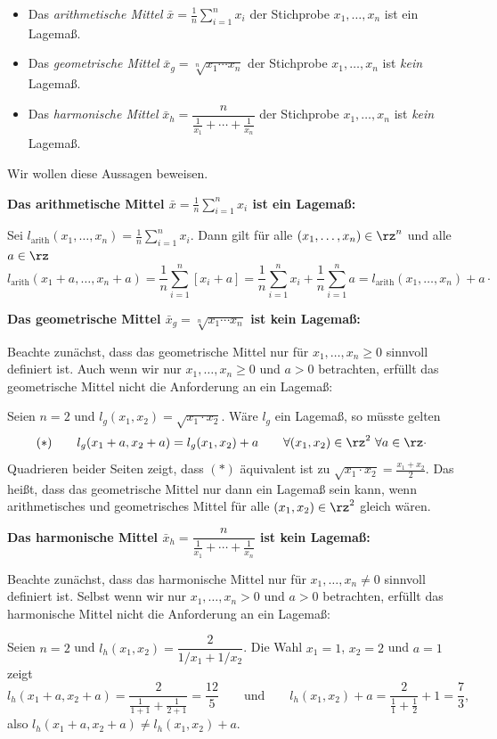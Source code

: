 \begin{bsp}
    \begin{itemize}
        \item Das \emph{arithmetische Mittel} $\bar x = \frac{1}{n}\sum_{i=1}^n x_i$ der Stichprobe $x_1,\dots,x_n$ ist ein \gls{Lagemaß}.
        \item Das \emph{geometrische Mittel} $\bar x_g = \sqrt[n]{x_1\cdots x_n}$ der Stichprobe $x_1,\dots,x_n$ ist \emph{kein} \gls{Lagemaß}.
        \item Das \emph{harmonische Mittel} $\bar x_h = \dfrac{n}{\frac{1}{x_1}+\cdots+\frac{1}{x_n}}$ der Stichprobe $x_1,\dots,x_n$ ist \emph{kein} \gls{Lagemaß}.
    \end{itemize}

    Wir wollen diese Aussagen beweisen.

    \smallskip
    \noindent\textbf{Das arithmetische Mittel $\bar x=\frac{1}{n}\sum_{i=1}^n x_i$ ist ein Lagemaß:}

    Sei $l_{\mathrm{arith}}(x_1,\dots,x_n) = \frac1n\sum_{i=1}^n x_i$.
    Dann gilt für alle $(x_1,\dots,x_n)\in\rz^n$ und alle $a\in\rz$
    \[
        l_{\mathrm{arith}}(x_1+a,\dots,x_n+a) = \frac1n \sum_{i=1}^n [x_i+a] = \frac1n\sum_{i=1}^n x_i + \frac1n\sum_{i=1}^n a = l_{\mathrm{arith}}(x_1,\dots,x_n) + a \cdot
    \]

    \smallskip
    \noindent\textbf{Das geometrische Mittel $\bar x_g = \sqrt[n]{x_1\cdots x_n}$ ist kein Lagemaß:}

    Beachte zunächst, dass das geometrische Mittel nur für $x_1,\dots,x_n\geq 0$ sinnvoll definiert ist.
    Auch wenn wir nur $x_1,\dots,x_n\geq 0$ und $a>0$ betrachten, erfüllt das geometrische Mittel nicht die Anforderung an ein \gls{Lagemaß}:

Seien $n=2$ und $l_g(x_1,x_2)=\sqrt{x_1\cdot x_2}$.
    Wäre $l_g$ ein \gls{Lagemaß}, so müsste gelten
    \[
        (*) \qquad l_g(x_1+a,x_2+a) = l_g(x_1,x_2)+a \qquad \forall (x_1,x_2)\in\rz^2 \ \forall a\in\rz \cdot
    \]
    Quadrieren beider Seiten zeigt, dass $(*)$ äquivalent ist zu $\sqrt{x_1\cdot x_2} = \frac{x_1+x_2}{2}$.
Das heißt, dass das geometrische Mittel nur dann ein \gls{Lagemaß} sein kann, wenn arithmetisches und geometrisches Mittel für alle $(x_1,x_2)\in\rz^2$ gleich wären.

    \smallskip
    \noindent\textbf{Das harmonische Mittel $\bar x_h = \dfrac{n}{\frac1{x_1}+\cdots+\frac1{x_n}}$ ist kein Lagemaß:}

    Beachte zunächst, dass das harmonische Mittel nur für $x_1,\dots,x_n\neq 0$ sinnvoll definiert ist.
    Selbst wenn wir nur $x_1,\dots,x_n>0$ und $a>0$ betrachten, erfüllt das harmonische Mittel nicht die Anforderung an ein \gls{Lagemaß}:

Seien $n=2$ und $l_h(x_1,x_2) = \dfrac{2}{1/x_1+1/x_2}$.
    Die Wahl $x_1=1$, $x_2=2$ und $a=1$ zeigt
    \[
        l_h(x_1+a,x_2+a) = \frac{2}{\frac1{1+1}+\frac1{2+1}} = \frac{12}{5}
        \qquad\text{und}\qquad
        l_h(x_1,x_2)+a = \frac{2}{\frac11+\frac12}+1 = \frac73 ,
    \]
    also $l_h(x_1+a,x_2+a)\neq l_h(x_1,x_2)+a$.
\end{bsp}

